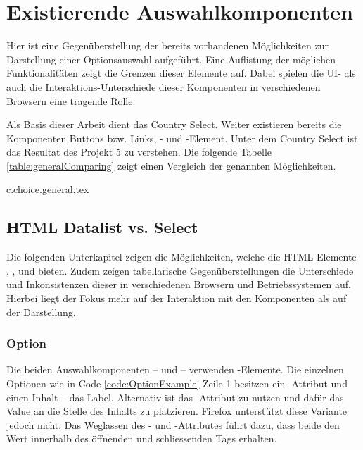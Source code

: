 \chapter{Existierende Auswahlkomponenten}
\label{chap:existingComponents}

Hier ist eine Gegenüberstellung der bereits vorhandenen Möglichkeiten zur Darstellung einer Optionsauswahl aufgeführt.
Eine Auflistung der möglichen Funktionalitäten zeigt die Grenzen dieser Elemente auf.
Dabei spielen die UI- als auch die Interaktions-Unterschiede dieser Komponenten in verschiedenen Browsern eine tragende Rolle.

Als Basis dieser Arbeit dient das Country Select.
Weiter existieren bereits die Komponenten Buttons bzw. Links, - und -Element.
Unter dem Country Select ist das Resultat des Projekt 5 zu verstehen.
Die folgende Tabelle \ref{table:generalComparing} zeigt einen Vergleich der genannten Möglichkeiten.

{c.choice.general.tex}


\section{HTML Datalist vs. Select}
\label{sec:datalistSelect}

Die folgenden Unterkapitel zeigen die Möglichkeiten, welche die HTML-Elemente , ,  und  bieten.
Zudem zeigen tabellarische Gegenüberstellungen die Unterschiede und Inkonsistenzen dieser in verschiedenen Browsern und Betriebssystemen auf.
Hierbei liegt der Fokus mehr auf der Interaktion mit den Komponenten als auf der Darstellung.


\subsection{Option}
\label{sec:option}

Die beiden Auswahlkomponenten –  und  – verwenden -Elemente. 
Die einzelnen Optionen wie in Code \ref{code:OptionExample} Zeile 1 besitzen ein -Attribut und einen Inhalt – das Label.
Alternativ ist das -Attribut zu nutzen und dafür das Value an die Stelle des Inhalts zu platzieren.
Firefox unterstützt diese Variante jedoch nicht.
Das Weglassen des - und -Attributes führt dazu, dass beide den Wert innerhalb des öffnenden und schliessenden Tags erhalten.

